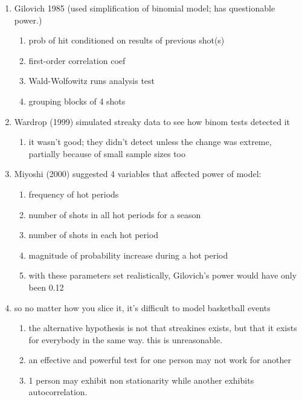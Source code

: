 \documentclass[12pt,twoside]{dukestatscithesis}
\providecommand{\tightlist}{%
  \setlength{\itemsep}{0pt}\setlength{\parskip}{0pt}}
\theoremstyle{definition}
\theoremstyle{definition}
\theoremstyle{definition}
\theoremstyle{remark}
\begin{document}
\begin{enumerate}
\def\labelenumi{\arabic{enumi}.}
\tightlist
\item
  Gilovich 1985 (used simplification of binomial model; has questionable
  power.)
  \begin{enumerate}
  \def\labelenumii{\alph{enumii}.}
  \tightlist
  \item
    prob of hit conditioned on results of previous shot(s)
  \item
    first-order correlation coef
  \item
    Wald-Wolfowitz runs analysis test
  \item
    grouping blocks of 4 shots
  \end{enumerate}
\item
  Wardrop (1999) simulated streaky data to see how binom tests detected
  it
  \begin{enumerate}
  \def\labelenumii{\alph{enumii}.}
  \tightlist
  \item
    it wasn't good; they didn't detect unless the change was extreme,
    partially because of small sample sizes too
  \end{enumerate}
\item
  Miyoshi (2000) suggested 4 variables that affected power of model:
  \begin{enumerate}
  \def\labelenumii{\alph{enumii}.}
  \tightlist
  \item
    frequency of hot periods
  \item
    number of shots in all hot periods for a season
  \item
    number of shots in each hot period
  \item
    magnitude of probability increase during a hot period
  \item
    with these parameters set realistically, Gilovich's power would have
    only been 0.12
  \end{enumerate}
\item
  so no matter how you slice it, it's difficult to model basketball
  events
  \begin{enumerate}
  \def\labelenumii{\alph{enumii}.}
  \tightlist
  \item
    the alternative hypothesis is not that streakines exists, but that
    it exists for everybody in the same way. this is unreasonable.
  \item
    an effective and powerful test for one person may not work for
    another
  \item
    1 person may exhibit non stationarity while another exhibits
    autocorrelation.
  \end{enumerate}
\end{enumerate}
\end{document}
